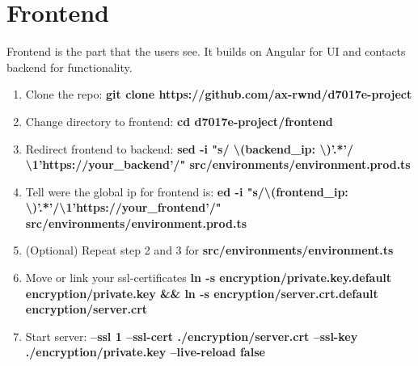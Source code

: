 \section{Frontend}
Frontend is the part that the users see. It builds on Angular for UI and contacts backend for functionality.

\begin{enumerate}
    \item Clone the repo: \textbf{git clone https://github.com/ax-rwnd/d7017e-project}
    \item Change directory to frontend: \textbf{cd d7017e-project/frontend}
    \item Redirect frontend to backend: \textbf{sed -i "s/ \textbackslash (backend\_ip: \textbackslash )'.*'/ \\ \textbackslash 1'https://{your\_backend}'/" src/environments/environment.prod.ts}
    \item Tell were the global ip for frontend is: \textbf{ed -i "s/\textbackslash (frontend\_ip: \\ \textbackslash)'.*'/\textbackslash 1'https://{your\_frontend}'/" src/environments/environment.prod.ts}
    \item (Optional) Repeat step 2 and 3 for \textbf{src/environments/environment.ts}
    \item Move or link your ssl-certificates \textbf{ln -s encryption/private.key.default encryption/private.key \&\& ln -s encryption/server.crt.default encryption/server.crt}
    \item Start server: \textbf{--ssl 1 --ssl-cert ./encryption/server.crt --ssl-key ./encryption/private.key --live-reload false}
\end{enumerate}